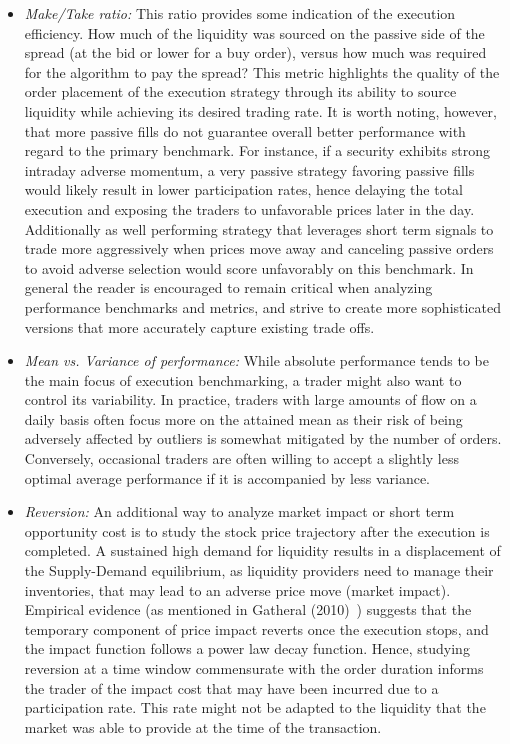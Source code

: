 \begin{itemize}
\item \emph{Make/Take ratio:} This ratio provides some indication of the execution efficiency. How much of the liquidity was sourced on the passive side of the spread (at the bid or lower for a buy order), versus how much was required for the algorithm to pay the spread? This metric highlights the quality of the order placement of the execution strategy through its ability to source liquidity while achieving its desired trading rate. It is worth noting, however, that more passive fills do not guarantee overall better performance with regard to the primary benchmark. For instance, if a security exhibits strong intraday adverse momentum, a very passive strategy favoring passive fills would likely result in lower participation rates, hence delaying the total execution and exposing the traders to unfavorable prices later in the day. Additionally as well performing strategy that leverages short term signals to trade more aggressively when prices move away and canceling passive orders to avoid adverse selection would score unfavorably on this benchmark. In general the reader is encouraged to remain critical when analyzing performance benchmarks and metrics, and strive to create more sophisticated versions that more accurately capture existing trade offs.

\item \emph{Mean vs. Variance of performance:} While absolute performance tends to be the main focus of execution benchmarking, a trader might also want to control its variability. In practice, traders with large amounts of flow on a daily basis often focus more on the attained mean as their risk of being adversely affected by outliers is somewhat mitigated by the number of orders. Conversely, occasional traders are often willing to accept a slightly less optimal average performance if it is accompanied by less variance.

\item \emph{Reversion:} An additional way to analyze market impact or short term opportunity cost is to study the stock price trajectory after the execution is completed. A sustained high demand for liquidity results in a displacement of the Supply-Demand equilibrium, as liquidity providers need to manage their inventories, that may lead to an adverse price move (market impact). Empirical evidence (as mentioned in Gatheral (2010)~\cite{gatheral}) suggests that the temporary component of price impact reverts once the execution stops, and the impact function follows a power law decay function. Hence, studying reversion at a time window commensurate with the order duration informs the trader of the impact cost that may have been incurred due to a participation rate. This rate might not be adapted to the liquidity that the market was able to provide at the time of the transaction.



\end{itemize}
